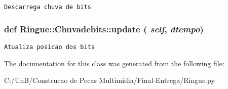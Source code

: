 \begin{footnotesize}\begin{verbatim}Descarrega chuva de bits \end{verbatim}
\end{footnotesize}
 \hypertarget{class_ringue_1_1_chuvadebits_1eb0a985e76e763622f6160cf72dbf8e}{
\subsubsection[{update}]{\setlength{\rightskip}{0pt plus 5cm}def Ringue::Chuvadebits::update ( {\em self}, \/   {\em dtempo})}}
\label{class_ringue_1_1_chuvadebits_1eb0a985e76e763622f6160cf72dbf8e}




\begin{footnotesize}\begin{verbatim}Atualiza posicao dos bits \end{verbatim}
\end{footnotesize}
 

The documentation for this class was generated from the following file:\begin{CompactItemize}
\item 
C:/UnB/Construcao de Pecas Multimidia/Final-Entrega/Ringue.py\end{CompactItemize}
